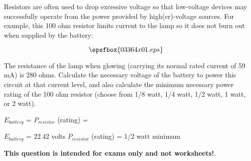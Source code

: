 

Resistors are often used to drop excessive voltage so that low-voltage devices may successfully operate from the power provided by high(er)-voltage sources.  For example, this 100 ohm resistor limits current to the lamp so it does not burn out when supplied by the battery:

$$\epsfbox{03364x01.eps}$$

The resistance of the lamp when glowing (carrying its normal rated current of 59 mA) is 280 ohms.  Calculate the necessary voltage of the battery to power this circuit at that current level, and also calculate the minimum necessary power rating of the 100 ohm resistor (choose from 1/8 watt, 1/4 watt, 1/2 watt, 1 watt, or 2 watt).

\vskip 10pt

$E_{battery}$ = \hskip 140pt $P_{resistor}$ (rating) = 







$E_{battery}$ = 22.42 volts \hskip 100pt $P_{resistor}$ (rating) = 1/2 watt minimum







{\bf This question is intended for exams only and not worksheets!}.



